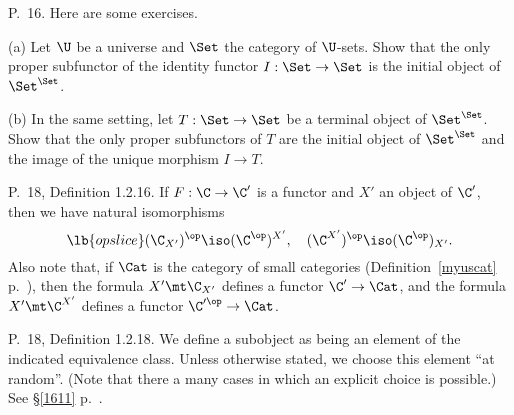 \documentclass[12pt]{article}
\theoremstyle{remark}
\theoremstyle{definition}
\begin{document}
%

\begin{s}%
P.~16. Here are some exercises. 

\nn(a) Let $\U$ be a universe and $\Set$ the category of $\U$-sets. Show that the only proper subfunctor of the identity functor $I:\Set\to\Set$ is the initial object of $\Set^{\Set}$.

\nn(b) In the same setting, let $T:\Set\to\Set$ be a terminal object of $\Set^{\Set}$. Show that the only proper subfunctors of $T$ are the initial object of $\Set^{\Set}$ and the image of the unique morphism $I\to T$.%
\end{s}

%

\begin{s}
P.~18, Definition 1.2.16. If $F:\C\to\C'$ is a functor and $X'$ an object of $\C'$, then we have natural isomorphisms 
\begin{equation}\lb{opslice}
(\C_{X'})^{\op}\iso(\C^{\op})^{X'},\quad(\C^{X'})^{\op}\iso(\C^{\op})_{X'}.
\end{equation} 
Also note that, if $\Cat$ is the category of small categories (Definition~\ref{myuscat} p.~), then the formula $X'\mt\C_{X'}$ defines a functor $\C'\to\Cat$, and the formula $X'\mt\C^{X'}$ defines a functor $\C'^{\op}\to\Cat$.
\end{s}

%

\begin{s}
P.~18, Definition 1.2.18. We define a subobject as being an element of the indicated equivalence class. Unless otherwise stated, we choose this element ``at random''. (Note that there a many cases in which an explicit choice is possible.) See \S\ref{1611} p.~\pageref{1611}.
\end{s}

%
\end{document}
